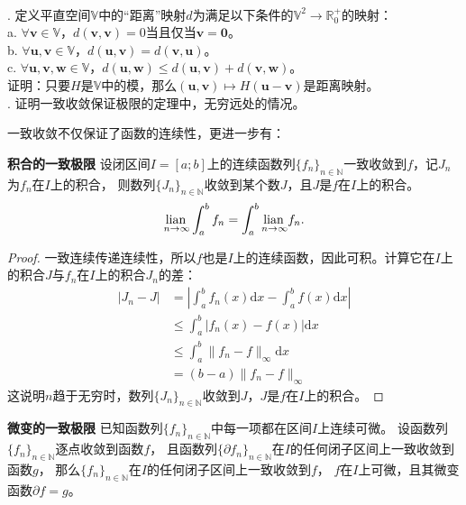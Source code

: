 \documentclass[12pt,UTF8]{ctexbook}
\begin{document}
\begin{appendix}
\begin{xt}
    \mbox{} \\
    . 定义平直空间$\mathbb{V}$中的“距离”映射$d$为满足以下条件的$\mathbb{V}^2 \rightarrow \mathbb{R}_0^+$的映射：\\
    \indent \indent a. $\forall \mathbf{v} \in \mathbb{V}$，$d(\mathbf{v}, \mathbf{v}) = 0$当且仅当$\mathbf{v} = \mathbf{0}$。\\
    \indent \indent b. $\forall \mathbf{u}, \mathbf{v} \in \mathbb{V}$，$d(\mathbf{u}, \mathbf{v}) = d(\mathbf{v}, \mathbf{u})$。\\
    \indent \indent c. $\forall \mathbf{u}, \mathbf{v}, \mathbf{w} \in \mathbb{V}$，$d(\mathbf{u}, \mathbf{w}) \leqslant d(\mathbf{u}, \mathbf{v}) + d(\mathbf{v}, \mathbf{w})$。\\
    \indent 证明：只要$H$是$\mathbb{V}$中的模，那么$(\mathbf{u}, \mathbf{v})\mapsto H(\mathbf{u} - \mathbf{v})$是距离映射。\\
    . 证明一致收敛保证极限的定理中，无穷远处的情况。
\end{xt}

一致收敛不仅保证了函数的连续性，更进一步有：

\begin{tm}{\textbf{积合的一致极限}}
    设闭区间$I=[a;b]$上的连续函数列$\{f_n\}_{n\in\mathbb{N}}$一致收敛到$f$，记$J_n$为$f_n$在$I$上的积合，
    则数列$\{J_n\}_{n\in\mathbb{N}}$收敛到某个数$J$，且$J$是$f$在$I$上的积合。
    $$ \underset{n\to \infty}{\operatorname{lian}\,} \int_a^b f_n = \int_a^b \underset{n\to\infty}{\operatorname{lian}\,} f_n. $$
\end{tm}

\begin{proof}
    一致连续传递连续性，所以$f$也是$I$上的连续函数，因此可积。计算它在$I$上的积合$J$与$f_n$在$I$上的积合$J_n$的差：
    \begin{align*}
        |J_n - J| &= \left|\int_a^b f_n(x)\mathrm{d}x - \int_a^b f(x)\mathrm{d}x \right| \\
        &\leqslant \int_a^b \left| f_n(x) - f(x)\right| \mathrm{d}x \\
        &\leqslant \int_a^b \| f_n - f\|_{\infty} \mathrm{d}x \\
        &= (b - a) \| f_n - f\|_{\infty}
    \end{align*}
    这说明$n$趋于无穷时，数列$\{J_n\}_{n\in\mathbb{N}}$收敛到$J$，$J$是$f$在$I$上的积合。

\end{proof}

\begin{tm}{\textbf{微变的一致极限}}
    已知函数列$\{f_n\}_{n\in\mathbb{N}}$中每一项都在区间$I$上连续可微。
    设函数列$\{f_n\}_{n\in\mathbb{N}}$逐点收敛到函数$f$，
    且函数列$\{\partial f_n\}_{n\in\mathbb{N}}$在$I$的任何闭子区间上一致收敛到函数$g$，
    那么$\{f_n\}_{n\in\mathbb{N}}$在$I$的任何闭子区间上一致收敛到$f$，
    $f$在$I$上可微，且其微变函数$\partial f = g$。


\end{tm}
\end{appendix}
\end{document}
